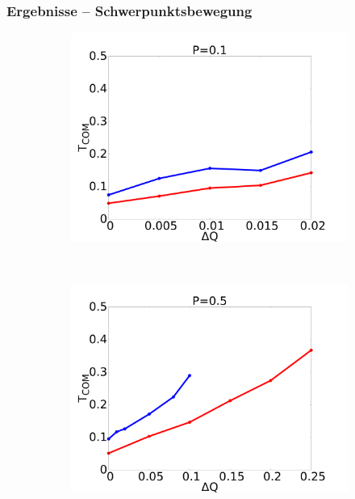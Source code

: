\documentclass[handout]{beamer}
\begin{document}
\begin{frame}
\frametitle{Ergebnisse -- Schwerpunktsbewegung}
\begin{figure}
    \begin{center}
        \begin{subfigure}[t]{0.3\textwidth}
            \includegraphics[scale=0.11]{../images/p01_com.pdf}
        \end{subfigure} 
        \
        \begin{subfigure}[t]{0.3\textwidth}
            \includegraphics[scale=0.11]{../images/p05_com.pdf}
        \end{subfigure} 
        \
        \begin{subfigure}[t]{0.3\textwidth}

\end{subfigure}
\end{center}
\end{figure}
\end{frame}
\end{document}
